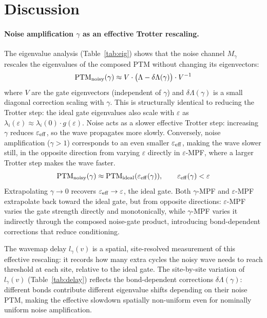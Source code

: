 \documentclass[12pt]{article}
\begin{document}
\section{Discussion}
\label{sec:discussion}

\paragraph{Noise amplification $\gamma$ as an effective Trotter rescaling.}
The eigenvalue analysis (Table~\ref{tab:eig}) shows that the noise channel
$M_\gamma$ rescales the eigenvalues of the composed PTM without changing its
eigenvectors:
\begin{equation}
    \mathrm{PTM}_{\rm noisy}(\gamma) \approx V \cdot \bigl(\Lambda - \delta\Lambda(\gamma)\bigr) \cdot V^{-1}
\end{equation}
where $V$ are the gate eigenvectors (independent of $\gamma$) and
$\delta\Lambda(\gamma)$ is a small diagonal correction scaling with $\gamma$.
This is structurally identical to reducing the Trotter step:
the ideal gate eigenvalues also scale with $\varepsilon$ as
$\lambda_i(\varepsilon) \approx \lambda_i(0)\cdot g(\varepsilon)$.
Noise acts as a slower effective Trotter step: increasing $\gamma$ reduces
$\varepsilon_{\rm eff}$, so the wave propagates more slowly.
Conversely, noise amplification ($\gamma > 1$) corresponds to an even smaller
$\varepsilon_{\rm eff}$, making the wave slower still, in the opposite direction
from varying $\varepsilon$ directly in $\varepsilon$-MPF, where a larger
Trotter step makes the wave faster.
\begin{equation}
    \mathrm{PTM}_{\rm noisy}(\gamma) \approx \mathrm{PTM}_{\rm ideal}(\varepsilon_{\rm eff}(\gamma)),
    \qquad \varepsilon_{\rm eff}(\gamma) < \varepsilon
\end{equation}
Extrapolating $\gamma \to 0$ recovers $\varepsilon_{\rm eff} \to \varepsilon$,
the ideal gate. Both $\gamma$-MPF and $\varepsilon$-MPF extrapolate back toward
the ideal gate, but from opposite directions: $\varepsilon$-MPF varies the gate
strength directly and monotonically, while $\gamma$-MPF varies it indirectly
through the composed noise-gate product, introducing bond-dependent corrections
that reduce conditioning.

The wavemap delay $l_\gamma(v)$ is a spatial, site-resolved measurement of
this effective rescaling: it records how many extra cycles the noisy wave needs
to reach threshold at each site, relative to the ideal gate.
The site-by-site variation of $l_\gamma(v)$ (Table~\ref{tab:delay}) reflects
the bond-dependent corrections $\delta\Lambda(\gamma)$: different bonds contribute
different eigenvalue shifts depending on their noise PTM, making the effective
slowdown spatially non-uniform even for nominally uniform noise amplification.
\end{document}
